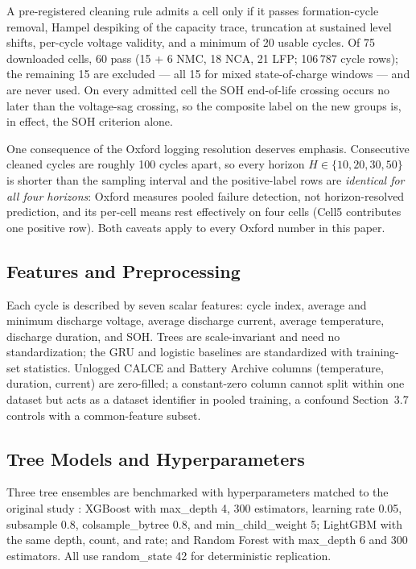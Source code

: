 \documentclass[preprint,12pt]{elsarticle}
\begin{document}
A pre-registered cleaning rule admits a cell only if it passes formation-cycle removal, Hampel despiking of the capacity trace, truncation at sustained level shifts, per-cycle voltage validity, and a minimum of 20 usable cycles. Of 75 downloaded cells, 60 pass (15 + 6 NMC, 18 NCA, 21 LFP; 106\,787 cycle rows); the remaining 15 are excluded --- all 15 for mixed state-of-charge windows --- and are never used. On every admitted cell the SOH end-of-life crossing occurs no later than the voltage-sag crossing, so the composite label on the new groups is, in effect, the SOH criterion alone.

One consequence of the Oxford logging resolution deserves emphasis. Consecutive cleaned cycles are roughly 100 cycles apart, so every horizon $H\in\{10,20,30,50\}$ is shorter than the sampling interval and the positive-label rows are \emph{identical for all four horizons}: Oxford measures pooled failure detection, not horizon-resolved prediction, and its per-cell means rest effectively on four cells (Cell5 contributes one positive row). Both caveats apply to every Oxford number in this paper.

\subsection{Features and Preprocessing}
Each cycle is described by seven scalar features: cycle index, average and minimum discharge voltage, average discharge current, average temperature, discharge duration, and SOH. Trees are scale-invariant and need no standardization; the GRU and logistic baselines are standardized with training-set statistics. Unlogged CALCE and Battery Archive columns (temperature, duration, current) are zero-filled; a constant-zero column cannot split within one dataset but acts as a dataset identifier in pooled training, a confound Section~3.7 controls with a common-feature subset.

\subsection{Tree Models and Hyperparameters}
Three tree ensembles are benchmarked with hyperparameters matched to the original study \cite{shikdar2026learning}: XGBoost \cite{chen2016xgboost} with max\_depth 4, 300 estimators, learning rate 0.05, subsample 0.8, colsample\_bytree 0.8, and min\_child\_weight 5; LightGBM \cite{ke2017lightgbm} with the same depth, count, and rate; and Random Forest \cite{breiman2001random} with max\_depth 6 and 300 estimators. All use random\_state 42 for deterministic replication.
\end{document}
